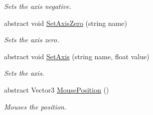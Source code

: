 \begin{DoxyCompactItemize}
\begin{DoxyCompactList}\small\item\em Sets the axis negative. \end{DoxyCompactList}\item 
abstract void \hyperlink{class_lerp2_assets_1_1_cross_platform_input_1_1_cross_platform_input_1_1_virtual_input_a2248ba83477a6911eb090f1d4b41d657}{Set\+Axis\+Zero} (string name)
\begin{DoxyCompactList}\small\item\em Sets the axis zero. \end{DoxyCompactList}\item 
abstract void \hyperlink{class_lerp2_assets_1_1_cross_platform_input_1_1_cross_platform_input_1_1_virtual_input_ae4af1efff7f6ea4ab616ffe9ba4633bf}{Set\+Axis} (string name, float value)
\begin{DoxyCompactList}\small\item\em Sets the axis. \end{DoxyCompactList}\item 
abstract Vector3 \hyperlink{class_lerp2_assets_1_1_cross_platform_input_1_1_cross_platform_input_1_1_virtual_input_a76252149fde904955d20431d19daced8}{Mouse\+Position} ()
\begin{DoxyCompactList}\small\item\em Mouses the position. \end{DoxyCompactList}\end{DoxyCompactItemize}
